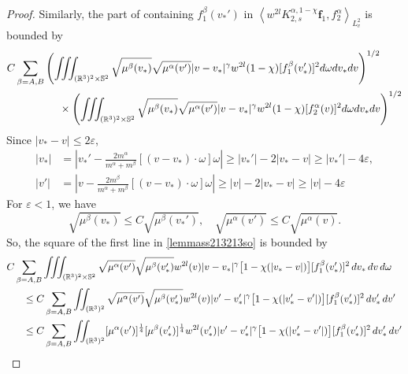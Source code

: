 \documentclass[reqno]{amsart}
\numberwithin{equation}{section}
\numberwithin{equation}{section}
\begin{document}
\begin{proof}
		Similarly, the part of containing $f^\beta_1(v_*')$ in $\left \langle  w^{2l}K_{2,s}^{\alpha,1-\chi}\mathbf{f}_1,f^{\alpha}_2\right \rangle_{L^{2}_{v}} $  is bounded by
		\begin{equation}\label{lemmass213213so}
			\begin{split}
					C\sum_{\beta=A,B} &\left(\iiint_{(\mathbb{R}^3)^2 \times \mathbb{S}^2}
				\sqrt{\mu^\beta(v_*)}\sqrt{\mu^\alpha(v')}|v - v_*|^\gamma w^{2l} (1 - \chi)[f^\beta_1(v_*')]^2
				d\omega dv_*dv\right)^{1/2}\\
				&\hspace{0.5cm}\times
				\left(\iiint_{(\mathbb{R}^3)^2 \times \mathbb{S}^2}
				\sqrt{\mu^\beta(v_*)}\sqrt{\mu^\alpha(v')}|v - v_*|^\gamma w^{2l} (1 - \chi)[f^\alpha_2(v)]^2
				d\omega dv_*dv\right)^{1/2}
			\end{split}	
		\end{equation}	
		Since $|v_* - v|\leq 2 \varepsilon$, 
		\begin{align*}
			|v_*| &= |v_*' - \frac{2m^{\alpha}}{m^\alpha+m^\beta}[(v-v_*)\cdot \omega]\omega| \geq |v_*'| - 2|v_* - v| \geq |v_*'| - 4\varepsilon, \\
			|v'| &= |v-\frac{2m^{\beta}}{m^\alpha+m^\beta}[(v-v_*)\cdot \omega]\omega| \geq |v| - 2|v_* - v| \geq |v| - 4\varepsilon
		\end{align*}
		For $\varepsilon<1$, we have
		\begin{equation*}
			\sqrt{\mu^\beta(v_*)}\leq C\sqrt{\mu^{\beta}(v_*')},\quad \sqrt{\mu^{\alpha}(v')}\leq C\sqrt{\mu^{\alpha}(v)}.
		\end{equation*}
		So, the square of the first line in \eqref{lemmass213213so} is bounded by
		\begin{align*}
			C&\sum_{\beta=A,B} \iiint_{(\mathbb{R}^3)^2 \times \mathbb{S}^2} \sqrt{\mu^{\alpha}(v')}\sqrt{\mu^{\beta}(v_*')}w^{2l}(v) |v - v_*|^\gamma \big[1 - \chi(|v_* - v|)\big] [f^{\beta}_1(v_*')]^2 \,dv_*\,dv\,d\omega \\
			&\hspace{0.3cm}\leq C \sum_{\beta=A,B} \iint_{(\mathbb{R}^3)^2} \sqrt{\mu^{\alpha}(v')}\sqrt{\mu^{\beta}(v_*')}w^{2l}(v) |v' - v_*'|^\gamma \big[1 - \chi(|v_*' - v'|)\big] [f^{\beta}_1(v_*')]^2 \,dv_*'\,dv' \\
				&\hspace{0.3cm}\leq C \sum_{\beta=A,B} \iint_{(\mathbb{R}^3)^2} [\mu^{\alpha}(v')]^{\frac{1}{4}}[\mu^{\beta}(v_*')]^{\frac{1}{4}}w^{2l}(v_*') |v' - v_*'|^\gamma \big[1 - \chi(|v_*' - v'|)\big] [f^{\beta}_1(v_*')]^2 \,dv_*'\,dv' \\

\end{align*}
\end{proof}
\end{document}
